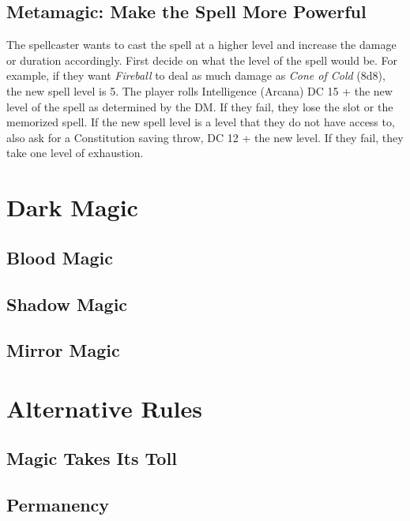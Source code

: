 \documentclass[twocolumn]{dndbook}
\begin{document}
\subsection{Metamagic: Make the Spell More Powerful}
The spellcaster wants to cast the spell at a higher level and increase the damage or duration accordingly.
First decide on what the level of the spell would be. For example, if they want \emph{Fireball} to deal as much damage as \emph{Cone of Cold} (8d8), the new spell level is 5.
The player rolls Intelligence (Arcana) DC 15 + the new level of the spell as determined by the DM.
If they fail, they lose the slot or the memorized spell.
If the new spell level is a level that they do not have access to, also ask for a Constitution saving throw, DC 12 + the new level.
If they fail, they take one level of exhaustion.



\section{Dark Magic}

\subsection{Blood Magic}

\subsection{Shadow Magic}

\subsection{Mirror Magic}

\section{Alternative Rules}

\subsection{Magic Takes Its Toll}

\subsection{Permanency}

\end{document}
